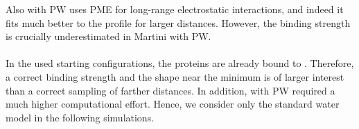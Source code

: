Also \martini{} with PW uses PME for long-range electrostatic interactions, and indeed it fits much better to the \charmm{} profile for larger distances. However, the binding strength is crucially underestimated in Martini with PW.\\
\\
In the used starting configurations, the proteins are already bound to \pip{}. Therefore, a correct binding strength and the shape near the minimum is of larger interest than a correct sampling of farther distances. In addition, \martini{} with PW required a much higher computational effort. Hence, we consider only the standard water model in the following simulations.
